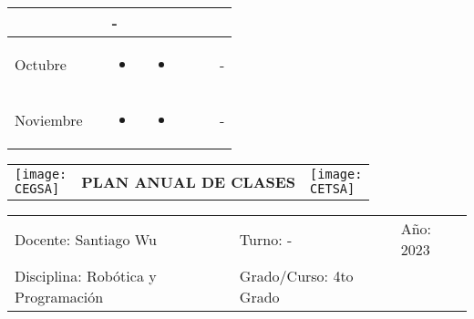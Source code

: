 \documentclass[landscape, a4paper, 10pt]{article}
\newcommand{\smallcellwidth}{0.7in}
\newcommand{\normalcellwidth}{1.2in}
\newcommand{\bigcellwidth}{2.0in}
\newcommand{\profesor}{Santiago Wu}
\newcommand{\discipline}{Robótica y Programación}
\newcommand{\currentyear}{2023}
\newcommand{\CEGSA}{cegsa-logo.png}
\newcommand{\CETSA}{cetsa-logo.png}
\begin{document}
\begin{longtable}{|m{\smallcellwidth}|p{\normalcellwidth}|p{\bigcellwidth}|p{\bigcellwidth}|p{\normalcellwidth}|p{\normalcellwidth}|p{\normalcellwidth}|}
		  &
		  &
		 - \\
		\hline
		Octubre &
		 &
		\begin{itemize}
			\item 
		\end{itemize} &
		\begin{itemize}
			\item 
		\end{itemize} &
		  &
		  &
		 - \\
		\hline
		Noviembre &
		 &
		\begin{itemize}
			\item 
		\end{itemize} &
		\begin{itemize}
			\item 
		\end{itemize} &
		  &
		  &
		 - \\
		\hline

	\end{longtable}
	\pagebreak[4]
	\begin{tabularx}{\textwidth}{ >{\raggedright\arraybackslash}X >{\centering\arraybackslash}X >{\raggedleft\arraybackslash}X }
		\texttt{[image: \\CEGSA]} &
		\textbf{PLAN ANUAL DE CLASES} &
		\texttt{[image: \\CETSA]}
	\end{tabularx}
	\begin{tabularx}{\textwidth}{ >{\raggedright\arraybackslash}X >{\raggedright\arraybackslash}X >{\raggedright\arraybackslash}X }
		Docente: \profesor &
		Turno: - &
		Año: \currentyear \\
		Disciplina: \discipline &
		Grado/Curso: 4to Grado &
		 \\
	\end{tabularx}
	\centering
\end{document}
